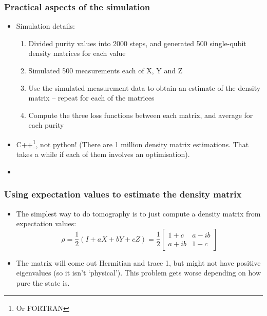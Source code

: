 \documentclass{beamer}
\begin{document}
\begin{frame}
  \frametitle{Practical aspects of the simulation}
  \begin{itemize}
  \item{Simulation details:
      \begin{enumerate}
      \item Divided purity values into {\color{blue}2000} steps, and generated {\color{blue}500} single-qubit density matrices for each value
      \item Simulated {\color{blue}500} measurements each of X, Y and Z
      \item Use the simulated measurement data to obtain an estimate of the density matrix -- repeat for each of the matrices
      \item Compute the three loss functions between each matrix, and average for each purity
      \end{enumerate}
  }
  \item C++\footnote{Or FORTRAN}, not python! (There are 1 million density matrix estimations. That takes a while if each of them involves an optimisation). 
  \item 
  \end{itemize}
  \end{frame}


\begin{frame}
  \frametitle{Using expectation values to estimate the density matrix}
  \begin{itemize}
  \item {The simplest way to do tomography is to just compute a density matrix from expectation values:
    \begin{equation}
      \rho = \frac{1}{2} (I + aX + bY + cZ) = \frac{1}{2}\begin{bmatrix} 1 + c & a - ib \\ a + ib & 1 -c\end{bmatrix}    
    \end{equation}
  }
\item The matrix will come out Hermitian and trace 1, but might not have positive eigenvalues (so it isn't `physical'). This problem gets worse depending on how pure the state is.
  \end{itemize}
\end{frame}
\end{document}
